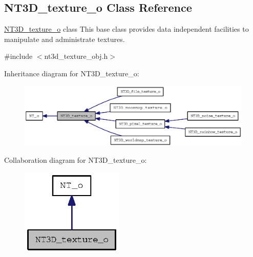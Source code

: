 \subsection{NT3D\_\-texture\_\-o Class Reference}
\label{class_n_t3_d__texture__o}


\hyperlink{class_n_t3_d__texture__o}{NT3D\_\-texture\_\-o} class This base class provides data independent facilities to manipulate and administrate textures.  




{\ttfamily \#include $<$nt3d\_\-texture\_\-obj.h$>$}



Inheritance diagram for NT3D\_\-texture\_\-o:
\nopagebreak
\begin{figure}[H]
\begin{center}
\leavevmode
\includegraphics[width=400pt]{class_n_t3_d__texture__o__inherit__graph}
\end{center}
\end{figure}


Collaboration diagram for NT3D\_\-texture\_\-o:
\nopagebreak
\begin{figure}[H]
\begin{center}
\leavevmode
\includegraphics[width=138pt]{class_n_t3_d__texture__o__coll__graph}
\end{center}
\end{figure}
